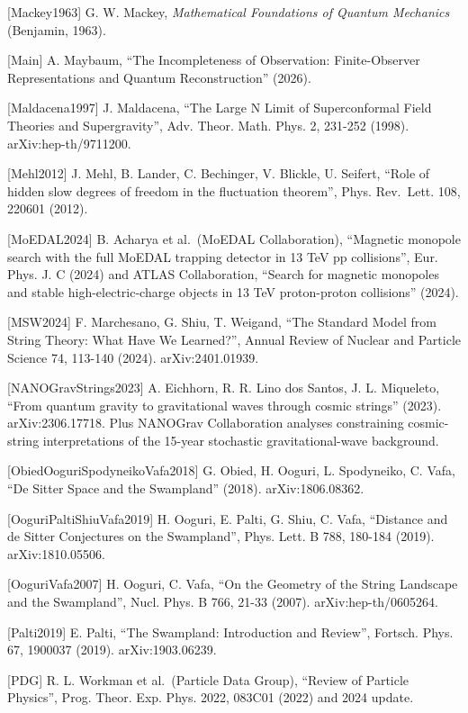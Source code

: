 \documentclass[
]{article}
\begin{document}
{[}Mackey1963{]} G. W. Mackey, \emph{Mathematical Foundations of Quantum
Mechanics} (Benjamin, 1963).

{[}Main{]} A. Maybaum, ``The Incompleteness of Observation:
Finite-Observer Representations and Quantum Reconstruction'' (2026).

{[}Maldacena1997{]} J. Maldacena, ``The Large N Limit of Superconformal
Field Theories and Supergravity'', Adv. Theor. Math. Phys. 2, 231-252
(1998). arXiv:hep-th/9711200.

{[}Mehl2012{]} J. Mehl, B. Lander, C. Bechinger, V. Blickle, U. Seifert,
``Role of hidden slow degrees of freedom in the fluctuation theorem'',
Phys. Rev.~Lett. 108, 220601 (2012).

{[}MoEDAL2024{]} B. Acharya et al.~(MoEDAL Collaboration), ``Magnetic
monopole search with the full MoEDAL trapping detector in 13 TeV pp
collisions'', Eur. Phys. J. C (2024) and ATLAS Collaboration, ``Search
for magnetic monopoles and stable high-electric-charge objects in 13 TeV
proton-proton collisions'' (2024).

{[}MSW2024{]} F. Marchesano, G. Shiu, T. Weigand, ``The Standard Model
from String Theory: What Have We Learned?'', Annual Review of Nuclear
and Particle Science 74, 113-140 (2024). arXiv:2401.01939.

{[}NANOGravStrings2023{]} A. Eichhorn, R. R. Lino dos Santos, J. L.
Miqueleto, ``From quantum gravity to gravitational waves through cosmic
strings'' (2023). arXiv:2306.17718. Plus NANOGrav Collaboration analyses
constraining cosmic-string interpretations of the 15-year stochastic
gravitational-wave background.

{[}ObiedOoguriSpodyneikoVafa2018{]} G. Obied, H. Ooguri, L. Spodyneiko,
C. Vafa, ``De Sitter Space and the Swampland'' (2018). arXiv:1806.08362.

{[}OoguriPaltiShiuVafa2019{]} H. Ooguri, E. Palti, G. Shiu, C. Vafa,
``Distance and de Sitter Conjectures on the Swampland'', Phys. Lett. B
788, 180-184 (2019). arXiv:1810.05506.

{[}OoguriVafa2007{]} H. Ooguri, C. Vafa, ``On the Geometry of the String
Landscape and the Swampland'', Nucl. Phys. B 766, 21-33 (2007).
arXiv:hep-th/0605264.

{[}Palti2019{]} E. Palti, ``The Swampland: Introduction and Review'',
Fortsch. Phys. 67, 1900037 (2019). arXiv:1903.06239.

{[}PDG{]} R. L. Workman et al.~(Particle Data Group), ``Review of
Particle Physics'', Prog. Theor. Exp. Phys. 2022, 083C01 (2022) and 2024
update.
\end{document}
